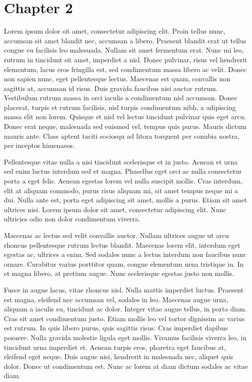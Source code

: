 \chapter{Chapter 2}

Lorem ipsum dolor sit amet, consectetur adipiscing elit. Proin tellus nunc, accumsan sit amet blandit nec, accumsan a libero. Praesent blandit erat ut tellus congue eu facilisis leo malesuada. Nullam sit amet fermentum erat. Nunc mi leo, rutrum in tincidunt sit amet, imperdiet a nisl. Donec pulvinar, risus vel hendrerit elementum, lacus eros fringilla est, sed condimentum massa libero ac velit. Donec non sapien nunc, eget pellentesque lectus. Maecenas est quam, convallis non sagittis at, accumsan id risus. Duis gravida faucibus nisi auctor rutrum. Vestibulum rutrum massa in orci iaculis a condimentum nisl accumsan. Donec placerat, turpis et rutrum facilisis, nisl turpis condimentum nibh, a adipiscing massa elit non lorem. Quisque et nisl vel lectus tincidunt pulvinar quis eget arcu. Donec erat neque, malesuada sed euismod vel, tempus quis purus. Mauris dictum mauris ante. Class aptent taciti sociosqu ad litora torquent per conubia nostra, per inceptos himenaeos.

Pellentesque vitae nulla a nisi tincidunt scelerisque et in justo. Aenean et urna sed enim luctus interdum sed et magna. Phasellus eget orci ac nulla consectetur porta a eget felis. Aenean egestas lorem vel nulla suscipit mollis. Cras interdum, elit at aliquam commodo, purus risus aliquam mi, sit amet tempus neque mi a dui. Nulla ante est, porta eget adipiscing sit amet, mollis a purus. Etiam sit amet ultrices nisi. Lorem ipsum dolor sit amet, consectetur adipiscing elit. Nunc ultricies odio non dolor condimentum viverra.

Maecenas ac lectus sed velit convallis auctor. Nullam ultrices augue ut arcu rhoncus pellentesque rutrum lectus blandit. Maecenas lorem elit, interdum eget egestas ac, ultrices a enim. Sed sodales nunc a lectus interdum non faucibus nunc ornare. Curabitur varius porttitor quam, congue elementum urna tristique in. In et magna libero, at pretium augue. Nunc scelerisque egestas justo non mollis.

Fusce in augue lacus, vitae rhoncus nisl. Nulla mattis imperdiet luctus. Praesent est magna, eleifend nec accumsan vel, sodales in leo. Maecenas augue urna, aliquam a iaculis eu, tincidunt ac dolor. Integer vitae augue tellus, in porta diam. Cras sit amet condimentum justo. Etiam mollis leo vel tortor dignissim ac varius est rutrum. In quis libero purus, quis sagittis risus. Cras imperdiet dapibus posuere. Nulla gravida molestie ligula eget mollis. Vivamus facilisis viverra leo, in tincidunt urna imperdiet et. Aenean turpis eros, pharetra eget faucibus at, eleifend eget neque. Duis augue nisi, hendrerit in malesuada nec, aliquet quis dolor. Donec ut condimentum est. Nunc ac lorem at diam dictum sodales ac vitae diam.

